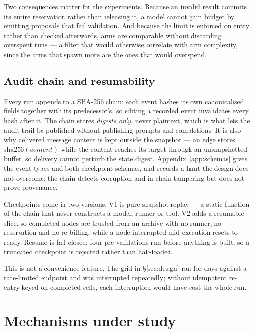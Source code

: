 \documentclass[10pt]{article}
\begin{document}
Two consequences matter for the experiments. Because an invalid result commits
its entire reservation rather than releasing it, a model cannot gain budget by
emitting proposals that fail validation. And because the limit is enforced on
entry rather than checked afterwards, arms are comparable without discarding
overspent runs --- a filter that would otherwise correlate with arm complexity,
since the arms that spawn more are the ones that would overspend.

\subsection{Audit chain and resumability}

Every run appends to a SHA-256 chain: each event hashes its own canonicalised
fields together with its predecessor's, so editing a recorded event invalidates
every hash after it. The chain stores \emph{digests only}, never plaintext,
which is what lets the audit trail be published without publishing prompts and
completions. It is also why delivered message content is kept outside the
snapshot --- an edge stores $\mathrm{sha256}(\mathit{content})$ while the
content reaches its target through an unsnapshotted buffer, so delivery cannot
perturb the state digest. Appendix~\ref{app:schemas} gives the event types and
both checkpoint schemas, and records a limit the design does not overcome: the
chain detects corruption and in-chain tampering but does not prove provenance.

Checkpoints come in two versions. V1 is pure snapshot replay --- a static
function of the chain that never constructs a model, runner or tool. V2 adds a
resumable slice, so completed nodes are trusted from an archive with no runner,
no reservation and no re-billing, while a node interrupted mid-execution resets
to ready. Resume is fail-closed: four pre-validations run before anything is
built, so a truncated checkpoint is rejected rather than half-loaded.

This is not a convenience feature. The grid in §\ref{sec:design} ran for days
against a rate-limited endpoint and was interrupted repeatedly; without
idempotent re-entry keyed on completed cells, each interruption would have cost
the whole run.

\section{Mechanisms under study}
\label{sec:mechanisms}
\end{document}
